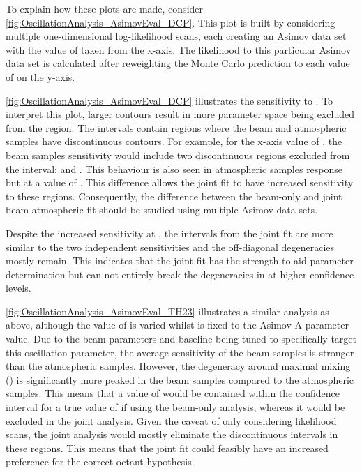 To explain how these plots are made, consider \autoref{fig:OscillationAnalysis_AsimovEval_DCP}. This plot is built by considering multiple one-dimensional log-likelihood scans, each creating an Asimov data set with the value of  taken from the x-axis. The likelihood to this particular Asimov data set is calculated after reweighting the Monte Carlo prediction to each value of  on the y-axis.

\autoref{fig:OscillationAnalysis_AsimovEval_DCP} illustrates the sensitivity to . To interpret this plot, larger contours result in more parameter space being excluded from the \quickmath{1\sigma} region. The \quickmath{1\sigma} intervals contain regions where the beam and atmospheric samples have discontinuous contours. For example, for the x-axis value of , the beam samples sensitivity would include two discontinuous regions excluded from the \quickmath{1\sigma} interval:  and . This behaviour is also seen in atmospheric samples response but at a value of . This difference allows the joint fit to have increased sensitivity to these regions. Consequently, the difference between the beam-only and joint beam-atmospheric fit should be studied using multiple Asimov data sets.

Despite the increased sensitivity at \quickmath{1\sigma}, the \quickmath{2\sigma} intervals from the joint fit are more similar to the two independent sensitivities and the off-diagonal degeneracies mostly remain. This indicates that the joint fit has the strength to aid parameter determination but can not entirely break the degeneracies in  at higher confidence levels. 

\autoref{fig:OscillationAnalysis_AsimovEval_TH23} illustrates a similar analysis as above, although the value of  is varied whilst  is fixed to the Asimov A parameter value. Due to the beam parameters and baseline being tuned to specifically target this oscillation parameter, the average sensitivity of the beam samples is stronger than the atmospheric samples. However, the degeneracy around maximal mixing () is significantly more peaked in the beam samples compared to the atmospheric samples. This means that a value of  would be contained within the \quickmath{1\sigma} confidence interval for a true value of  if using the beam-only analysis, whereas it would be excluded in the joint analysis. Given the caveat of only considering likelihood scans, the joint analysis would mostly eliminate the discontinuous intervals in these regions. This means that the joint fit could feasibly have an increased preference for the correct octant hypothesis.

